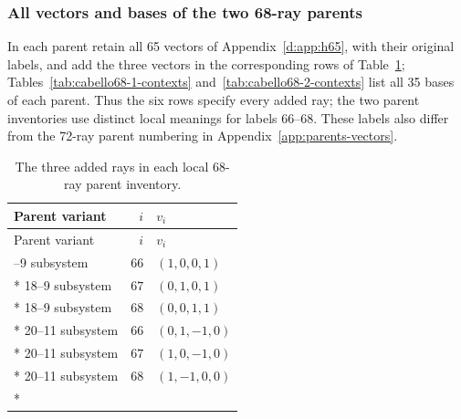 \documentclass[aps,pra,reprint,superscriptaddress,longbibliography,nofootinbib,floatfix,10pt]{revtex4-2}
\theoremstyle{definition}
\begin{document}
\subsubsection{All vectors and bases of the two 68-ray parents}
In each parent retain all 65 vectors of Appendix~\ref{d:app:h65},
with their original labels, and add the three vectors in the
corresponding rows of Table~\ref{tab:cabello68-rays};
Tables~\ref{tab:cabello68-1-contexts} and~\ref{tab:cabello68-2-contexts}
list all 35 bases of each parent. Thus the six rows specify every added ray;
the two parent inventories use distinct local meanings for labels 66--68.
These labels also differ from the 72-ray parent numbering in
Appendix~\ref{app:parents-vectors}.
\begingroup\small
{}
\begin{longtable}{lrl}
\caption{The three added rays in each local 68-ray parent inventory.}\label{tab:cabello68-rays}\\
\toprule
Parent variant & $i$ & $v_i$\\\midrule
\endfirsthead
\toprule
Parent variant & $i$ & $v_i$\\\midrule
\endhead
\bottomrule\endfoot
18--9 subsystem & $66$ & $(1,0,0,1)$\\*
18--9 subsystem & $67$ & $(0,1,0,1)$\\*
18--9 subsystem & $68$ & $(0,0,1,1)$\\*
20--11 subsystem & $66$ & $(0,1,-1,0)$\\*
20--11 subsystem & $67$ & $(1,0,-1,0)$\\*
20--11 subsystem & $68$ & $(1,-1,0,0)$\\*
\end{longtable}
\endgroup
\begingroup\small
{}
\end{document}
